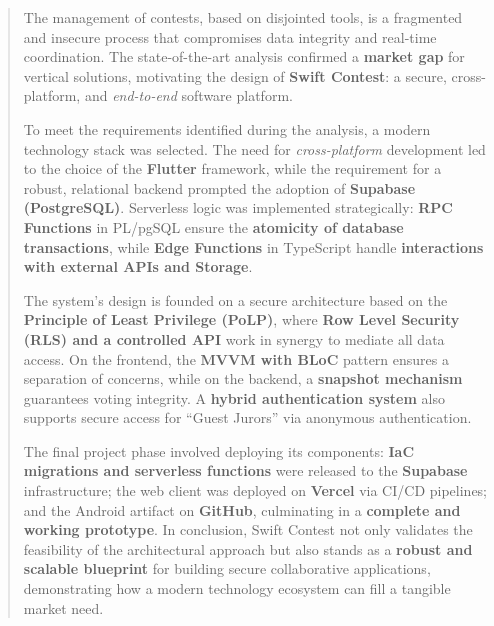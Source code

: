 \begin{titlepage}
    \begin{abstract}
        The management of contests, based on disjointed tools, is a fragmented and insecure process that compromises data integrity and real-time coordination.
        The state-of-the-art analysis confirmed a \textbf{market gap} for vertical solutions, motivating the design of \textbf{Swift Contest}: a secure, cross-platform, and \emph{end-to-end} software platform.

        To meet the requirements identified during the analysis, a modern technology stack was selected.
        The need for \emph{cross-platform} development led to the choice of the \textbf{Flutter} framework, while the requirement for a robust, relational backend prompted the adoption of \textbf{Supabase (PostgreSQL)}.
        Serverless logic was implemented strategically: \textbf{RPC Functions} in PL/pgSQL ensure the \textbf{atomicity of database transactions}, while \textbf{Edge Functions} in TypeScript handle \textbf{interactions with external APIs and Storage}.

        The system's design is founded on a secure architecture based on the \textbf{Principle of Least Privilege (PoLP)}, where \textbf{Row Level Security (RLS) and a controlled API} work in synergy to mediate all data access.
        On the frontend, the \textbf{MVVM with BLoC} pattern ensures a separation of concerns, while on the backend, a \textbf{snapshot mechanism} guarantees voting integrity.
        A \textbf{hybrid authentication system} also supports secure access for ``Guest Jurors'' via anonymous authentication.

        The final project phase involved deploying its components: \textbf{IaC migrations and serverless functions} were released to the \textbf{Supabase} infrastructure; the web client was deployed on \textbf{Vercel} via CI/CD pipelines; and the Android artifact on \textbf{GitHub}, culminating in a \textbf{complete and working prototype}.
        In conclusion, Swift Contest not only validates the feasibility of the architectural approach but also stands as a \textbf{robust and scalable blueprint} for building secure collaborative applications, demonstrating how a modern technology ecosystem can fill a tangible market need.
        \\[1cm]
    \end{abstract}
\end{titlepage}